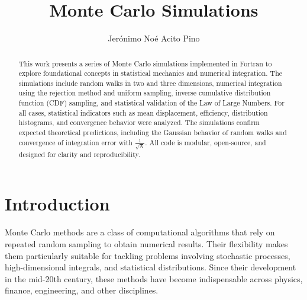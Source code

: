\usepackage{comment}
\usepackage{graphicx}
\usepackage{tcolorbox}
\usepackage{listings}
\usepackage{subcaption}
\usepackage{multicol}
\usepackage{siunitx}
\usepackage{float}
\usepackage{hyperref}
\usepackage[affil-it]{authblk}
\usepackage{bm}
\usepackage{lipsum}
\pgfplotsset{width=8cm,compat=1.9}
\captionsetup{subrefformat=parens}
\graphicspath{{images/}}
\newcommand{\quotes}[1]{``#1''}

\title{Monte Carlo Simulations}
\author{Jerónimo Noé Acito Pino}
\date{}



\maketitle
\begin{abstract}
    This work presents a series of Monte Carlo simulations implemented in Fortran to explore foundational concepts in statistical mechanics and numerical integration. The simulations include random walks in two and three dimensions, numerical integration using the rejection method and uniform sampling, inverse cumulative distribution function (CDF) sampling, and statistical validation of the Law of Large Numbers. For all cases, statistical indicators such as mean displacement, efficiency, distribution histograms, and convergence behavior were analyzed. The simulations confirm expected theoretical predictions, including the Gaussian behavior of random walks and convergence of integration error with $\frac{1}{\sqrt{N}}$. All code is modular, open-source, and designed for clarity and reproducibility.
\end{abstract}

\section{Introduction}
Monte Carlo methods are a class of computational algorithms that rely on repeated random sampling to obtain numerical results. Their flexibility makes them particularly suitable for tackling problems involving stochastic processes, high-dimensional integrals, and statistical distributions. Since their development in the mid-20th century, these methods have become indispensable across physics, finance, engineering, and other disciplines.

